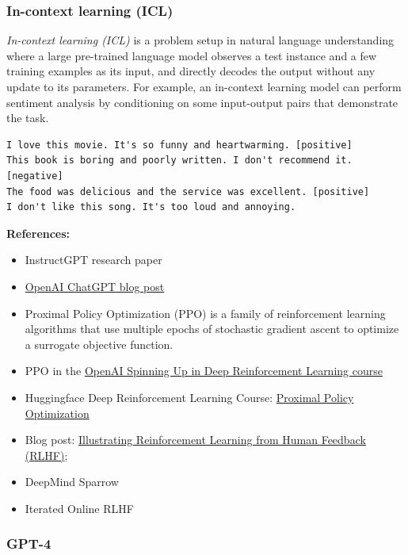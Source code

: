 \documentclass[11pt, a4paper]{amsart}
\begin{document}
\subsubsection{In-context learning (ICL)}

\emph{In-context learning (ICL)} is a problem setup in natural language understanding where a large pre-trained language model observes a test instance and a few training examples as its input, and directly decodes the output without any update to its parameters.
For example, an in-context learning model can perform sentiment analysis by conditioning on some input-output pairs that demonstrate the task.

\begin{lstlisting}
I love this movie. It's so funny and heartwarming. [positive]
This book is boring and poorly written. I don't recommend it. [negative]
The food was delicious and the service was excellent. [positive]
I don't like this song. It's too loud and annoying.
\end{lstlisting}

\noindent \textbf{References:}
\begin{itemize}
	\item InstructGPT research paper \cite{ouyang2022training}
	\item \href{https://openai.com/blog/chatgpt}{OpenAI ChatGPT blog post}
	\item Proximal Policy Optimization (PPO) \cite{schulman2017proximal} is a family of reinforcement learning algorithms that use multiple epochs of stochastic gradient ascent to optimize a surrogate objective function.
	\item PPO in the \href{https://spinningup.openai.com/en/latest/algorithms/ppo.html}{OpenAI Spinning Up in Deep Reinforcement Learning course}
	\item Huggingface Deep Reinforcement Learning Course: \href{https://huggingface.co/deep-rl-course/unit8/introduction?fw=pt}{Proximal Policy Optimization}
	\item Blog post: \href{https://huggingface.co/blog/rlhf}{Illustrating Reinforcement Learning from Human Feedback (RLHF)}; \cite{lambert2022illustrating}
	\item DeepMind Sparrow \cite{glaese2022improving}
	\item Iterated Online RLHF \cite{bai2022training}
\end{itemize}

\subsubsection{GPT-4}
\end{document}
